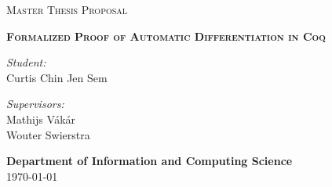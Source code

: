 \documentclass[a4, 12pt, final]{article}
\begin{document}
\begin{titlepage}

\begin{figure}
   \begin{minipage}{0.48\textwidth}
   \begin{flushleft}
   \end{flushleft}
   \end{minipage}\hfill
   \begin{minipage}{0.48\textwidth}
   \begin{flushright}
   \end{flushright}
   \end{minipage}
\end{figure}

\thispagestyle{fancy}

\vspace{1in}

\center

\textsc{\large Master Thesis Proposal}

\vspace{0.5in}

\noindent\makebox[\linewidth]{\rule{\linewidth}{1.2pt}}
\textsc{\textbf{\large Formalized Proof of Automatic Differentiation in Coq}}
\noindent\makebox[\linewidth]{\rule{\linewidth}{1.2pt}}

\vspace{0.5in}

\begin{minipage}{0.48\textwidth}
    \begin{flushleft}
        \textit{Student:} \\
        Curtis Chin Jen Sem \\
    \end{flushleft}
\end{minipage}
\begin{minipage}{0.48\textwidth}
    \begin{flushright}
    \textit{Supervisors:} \\
    Mathijs V\'{a}k\'{a}r \\
    Wouter Swierstra \\
    \end{flushright}
\end{minipage}

\vspace{2in}

\textbf{\large Department of Information and Computing Science} \\

\today

\end{titlepage}
\end{document}
